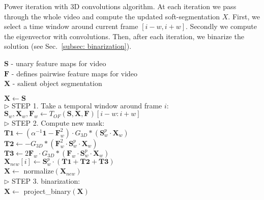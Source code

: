 \documentclass{article}
\begin{document}
\begin{algorithm}[h]
    \caption{Power iteration with 3D convolutions algorithm.  At each iteration we pass through the whole video and compute the updated soft-segmentation $X$. First, we  select a time window around current frame $[i-w, i+w]$. Secondly we compute the eigenvector with convolutions. Then, after each iteration, we binarize the solution (see Sec.~\ref{subsec: binarization}).}
    \label{alg: power_iteration}
    $\mathbf{S}$ - unary feature maps for video\\
    $\mathbf{F}$ - defines pairwise feature maps for video\\
    $\mathbf{X}$ - salient object segmentation \begin{algorithmic}[1]
        \STATE $ \mathbf{X} \leftarrow \mathbf{S}$\\
         {
             {
                \STATE \(\triangleright\) STEP 1. Take a temporal window around frame $i$:\\
                \STATE $\mathbf{S}_w, \mathbf{X}_w, \mathbf{F}_w \leftarrow T_{OF}(\mathbf{S}, \mathbf{X}, \mathbf{F}) [i-w:i+w]$\\
\STATE \(\triangleright\) STEP 2. Compute new mask:\\
                \STATE $\mathbf{T1} \leftarrow  (\alpha^{-1}\mathbf{1} - \mathbf{F}_w^2) \cdot G_{3D} * (\mathbf{S}^p_w \cdot \mathbf{X}_w) $\\
                \STATE $\mathbf{T2} \leftarrow - G_{3D} * (\mathbf{F}_w^2 \cdot \mathbf{S}_w^p \cdot \mathbf{X}_w)$\\
                \STATE $\mathbf{T3} \leftarrow 2 \mathbf{F}_w \cdot G_{3D} * (\mathbf{F}_w \cdot \mathbf{S}_w^p \cdot \mathbf{X}_w)$\\
                \STATE $\mathbf{X}_{new}[i] \leftarrow \mathbf{S}_w^p \cdot (\mathbf{T1} + \mathbf{T2} + \mathbf{T3}) $\\
            }
            \ENDFOR
            \STATE $\mathbf{X} \leftarrow$ normalize$(\mathbf{X}_{new})$\\
\STATE \(\triangleright\) STEP 3. binarization:\\
            \STATE $\mathbf{X} \leftarrow$ project\_binary$(\mathbf{X})$
        }
        \ENDFOR
    \end{algorithmic}
\end{algorithm}
\end{document}
